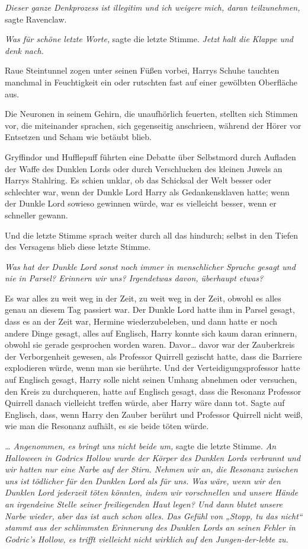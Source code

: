{\emph{Dieser ganze Denkprozess ist illegitim und ich weigere mich, daran teilzunehmen,} sagte Ravenclaw.

\emph{Was für schöne letzte Worte,} sagte die letzte Stimme. \emph{Jetzt halt die Klappe und denk nach.}

Raue Steintunnel zogen unter seinen Füßen vorbei, Harrys Schuhe tauchten manchmal in Feuchtigkeit ein oder rutschten fast auf einer gewölbten Oberfläche aus.

Die Neuronen in seinem Gehirn, die unaufhörlich feuerten, stellten sich Stimmen vor, die miteinander sprachen, sich gegenseitig anschrieen, während der Hörer vor Entsetzen und Scham wie betäubt blieb.

Gryffindor und Hufflepuff führten eine Debatte über Selbstmord durch Aufladen der Waffe des Dunklen Lords oder durch Verschlucken des kleinen Juwels an Harrys Stahlring. Es schien unklar, ob das Schicksal der Welt besser oder schlechter war, wenn der Dunkle Lord Harry als Gedankensklaven hatte; wenn der Dunkle Lord sowieso gewinnen würde, war es vielleicht besser, wenn er schneller gewann.

Und die letzte Stimme sprach weiter durch all das hindurch; selbst in den Tiefen des Versagens blieb diese letzte Stimme.

\emph{Was hat der Dunkle Lord sonst noch immer in menschlicher Sprache gesagt und nie in Parsel? Erinnern wir uns? Irgendetwas davon, überhaupt etwas?}

Es war alles zu weit weg in der Zeit, zu weit weg in der Zeit, obwohl es alles genau an diesem Tag passiert war. Der Dunkle Lord hatte ihm in Parsel gesagt, dass es an der Zeit war, Hermine wiederzubeleben, und dann hatte er noch andere Dinge gesagt, alles auf Englisch, Harry konnte sich kaum daran erinnern, obwohl sie gerade gesprochen worden waren. Davor… davor war der Zauberkreis der Verborgenheit gewesen, als Professor Quirrell gezischt hatte, dass die Barriere explodieren würde, wenn man sie berührte. Und der Verteidigungsprofessor hatte auf Englisch gesagt, Harry solle nicht seinen Umhang abnehmen oder versuchen, den Kreis zu durchqueren, hatte auf Englisch gesagt, dass die Resonanz Professor Quirrell danach vielleicht treffen würde, aber Harry wäre dann tot. Sagte auf Englisch, dass, wenn Harry den Zauber berührt und Professor Quirrell nicht weiß, wie man die Resonanz aufhält, es sie beide töten würde.

\emph{… Angenommen, es bringt uns nicht beide um,} sagte die letzte Stimme. \emph{An Halloween in Godrics Hollow wurde der Körper des Dunklen Lords verbrannt und wir hatten nur eine Narbe auf der Stirn. Nehmen wir an, die Resonanz zwischen uns ist tödlicher für den Dunklen Lord als für uns. Was wäre, wenn wir den Dunklen Lord jederzeit töten könnten, indem wir vorschnellen und unsere Hände an irgendeine Stelle seiner freiliegenden Haut legen? Und dann blutet unsere Narbe wieder, aber das ist auch schon alles. Das Gefühl von „Stopp, tu das nicht“ stammt aus der schlimmsten Erinnerung des Dunklen Lords an seinen Fehler in Godric's Hollow, es trifft vielleicht nicht wirklich auf den Jungen-der-lebte zu.}

}

